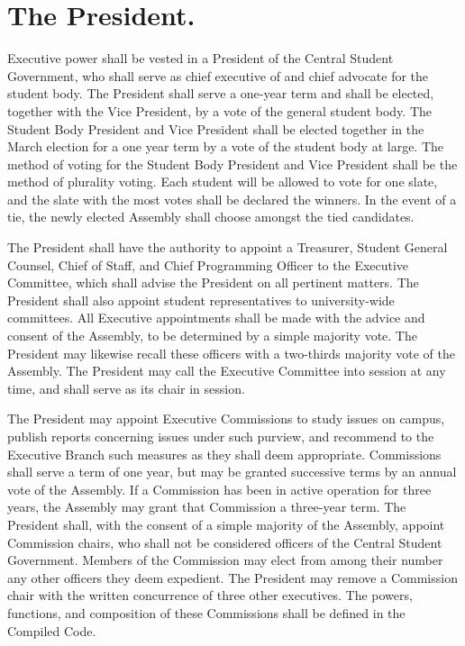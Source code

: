 \section{The President.}
    Executive power shall be vested in a President of the Central Student Government, who shall serve as chief executive of and chief advocate for the student body. The President shall serve a one-year term and shall be elected, together with the Vice President, by a vote of the general student body. The Student Body President and Vice President shall be elected together in the March election for a one year term by a vote of the student body at large.  The method of voting for the Student Body President and Vice President shall be the method of plurality voting.  Each student will be allowed to vote for one slate, and the slate with the most votes shall be declared the winners.  In the event of a tie, the newly elected Assembly shall choose amongst the tied candidates.

    The President shall have the authority to appoint a Treasurer, Student General Counsel, Chief of Staff, and Chief Programming Officer to the Executive Committee, which shall advise the President on all pertinent matters. The President shall also appoint student representatives to university-wide committees. All Executive appointments shall be made with the advice and consent of the Assembly, to be determined by a simple majority vote. The President may likewise recall these officers with a two-thirds majority vote of the Assembly. The President may call the Executive Committee into session at any time, and shall serve as its chair in session.

    The President may appoint Executive Commissions to study issues on campus, publish reports concerning issues under such purview, and recommend to the Executive Branch such measures as they shall deem appropriate. Commissions shall serve a term of one year, but may be granted successive terms by an annual vote of the Assembly. If a Commission has been in active operation for three years, the Assembly may grant that Commission a three-year term. The President shall, with the consent of a simple majority of the Assembly, appoint Commission chairs, who shall not be considered officers of the Central Student Government. Members of the Commission may elect from among their number any other officers they deem expedient. The President may remove a Commission chair with the written concurrence of three other executives. The powers, functions, and composition of these Commissions shall be defined in the Compiled Code.

